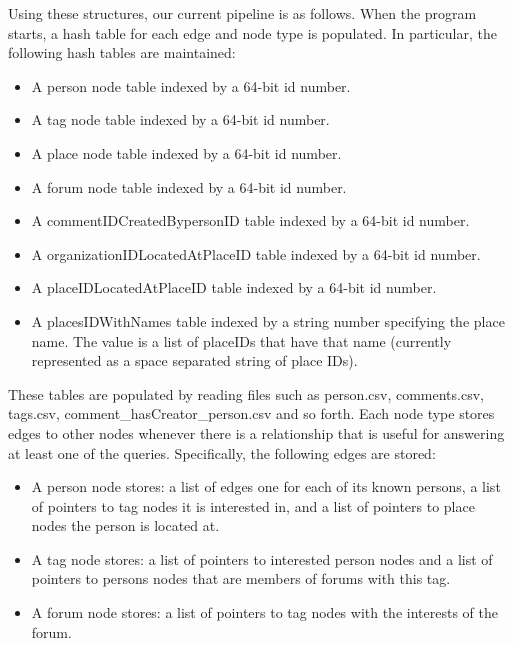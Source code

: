 \documentclass{article}
\begin{document}
Using these structures, our current pipeline is as follows. When the program starts, a
hash table for each edge and node type is populated. In particular, the following hash tables are maintained:

\begin{itemize}
\item A person node table indexed by a 64-bit id number.
\item A tag node table indexed by a 64-bit id number.
\item A place node table indexed by a 64-bit id number.
\item A forum node table indexed by a 64-bit id number. 
\item A commentIDCreatedBypersonID table indexed by a 64-bit id number.
\item A organizationIDLocatedAtPlaceID table indexed by a 64-bit id number.
\item A placeIDLocatedAtPlaceID table indexed by a 64-bit id number.
\item A placesIDWithNames table indexed by a string number specifying the place name. The value is a list of placeIDs that have that name (currently represented as a space separated string of place IDs).
\end{itemize}

These tables are populated by reading files such as person.csv, 
comments.csv, tags.csv, comment\_hasCreator\_person.csv and so forth. 
Each node type stores edges to other nodes whenever there is a relationship
that is useful for answering at least one of the queries. Specifically,
the following edges are stored:

\begin{itemize}
\item A person node stores: a list of edges one for each of its known persons, a list of pointers to tag nodes it is interested in, and a list of pointers to place nodes the person is located at.
\item A tag node stores: a list of pointers to interested person nodes and a list of pointers to persons nodes that are members of forums with this tag. 
\item A forum node stores: a list of pointers to tag nodes with the interests of the forum. 
\end{itemize}

\end{document}
